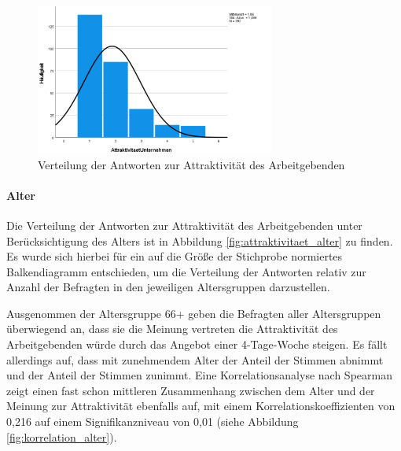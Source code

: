 \begin{figure}[h]
    \centering
    \includegraphics[width=0.7\textwidth]{04_Artefakte/01_Abbildungen/hypothese_5/attraktivitaet_histogram.png}
    \caption{Verteilung der Antworten zur Attraktivität des Arbeitgebenden}
    \label{fig:attraktivitaet_verteilung}
\end{figure}

\paragraph*{Alter}


Die Verteilung der Antworten zur Attraktivität des Arbeitgebenden unter Berücksichtigung des Alters ist in Abbildung \ref{fig:attraktivitaet_alter}
zu finden. Es wurde sich hierbei für ein auf die Größe der Stichprobe normiertes Balkendiagramm entschieden, um die Verteilung der Antworten
relativ zur Anzahl der Befragten in den jeweiligen Altersgruppen darzustellen.

Ausgenommen der Altersgruppe 66+ geben die Befragten aller Altersgruppen überwiegend an, dass sie die Meinung vertreten die 
Attraktivität des Arbeitgebenden würde durch das Angebot einer 4-Tage-Woche steigen. Es fällt allerdings auf, dass mit 
zunehmendem Alter der Anteil der  Stimmen abnimmt und der Anteil der  Stimmen zunimmt. Eine 
Korrelationsanalyse nach Spearman zeigt einen fast schon mittleren Zusammenhang zwischen dem 
Alter und der Meinung zur Attraktivität ebenfalls auf, mit einem Korrelationskoeffizienten von 0,216 auf einem Signifikanzniveau von 
0,01 (siehe Abbildung \ref{fig:korrelation_alter}).

